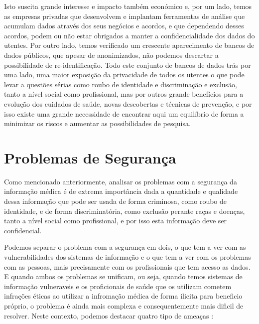 \documentclass[conference]{IEEEtran}
\begin{document}
Isto suscita grande interesse e impacto também económico e, por um lado, temos as empresas privadas que desenvolvem e implantam ferramentas de análise que acumulam dados através dos seus negócios e acordos, e que dependendo desses acordos, podem ou não estar obrigados a manter a confidencialidade dos dados do utentes. Por outro lado, temos verificado um crescente aparecimento de bancos de dados públicos, que apesar de anonimizados, não podemos descartar a possibilidade de re-identificação. Todo este conjunto de bancos de dados trás por uma lado, uma maior exposição da privacidade de todos os utentes o que pode levar a questões sérias como roubo de identidade e discriminação e exclusão, tanto a nível social como profissional, mas por outros grande benefícios para a evolução dos cuidados de saúde, novas descobertas e técnicas de prevenção, e por isso existe uma grande necessidade de encontrar aqui um equilíbrio de forma a minimizar os riscos e aumentar as possibilidades de pesquisa.



\section{Problemas de Segurança}	\label{probseg}

Como mencionado anteriormente, analisar os problemas com a segurança da informação médica é de extrema importância dada a quantidade e qualidade dessa informação que pode ser usada de forma criminosa, como roubo de identidade, e de forma discriminatória, como exclusão perante raças e doenças, tanto a nível social como profissional, e por isso esta informação deve ser confidencial.

Podemos separar o problema com a segurança em dois, o que tem a ver com as vulnerabilidades dos sistemas de informação e o que tem a ver com os problemas com as pessoas, mais precisamente com os profissionais que tem acesso as dados.
E quando ambos os problemas se unificam, ou seja, quando temos sistemas de informação vulneraveis e os proficionais de saúde que os utilizam cometem infrações éticas ao utilizar a infromação médica de forma ilicita para beneficio próprio, o problema é ainda mais complexa e consequentemente mais dificil de resolver. Neste contexto, podemos destacar quatro tipo de ameaças \cite{kayarkar2012classification}:
\end{document}
